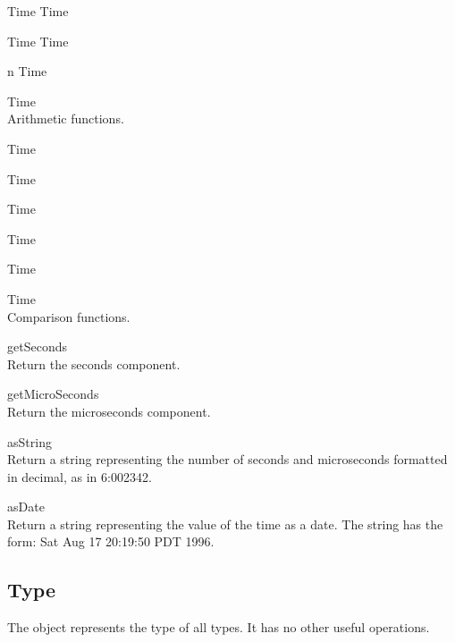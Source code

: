 \begin{desc}
  \item[\kw{function} \opd{$+$} \/\LB{}Time\/\RB{} \returns{} \/\LB{}Time\/\RB{}]
  \item[\kw{function} \opd{$-$} \/\LB{}Time\/\RB{} \returns{} \/\LB{}Time\/\RB{}]
  \item[\kw{function} \opd{$*$} \/\LB{}n \CO{} \tn{Integer}\/\RB{} \returns{} \/\LB{}Time\/\RB{}]
  \item[\kw{function} \opd{$/$} \/\LB{}\tn{Integer}\/\RB{} \returns{} \/\LB{}Time\/\RB{}]~\\
    Arithmetic functions.
  \item[\kw{function} \opd{$>$} \/\LB{}Time\/\RB{} \returns{} \/\LB{}\tn{Boolean}\/\RB{}]
  \item[\kw{function} \opd{$>=$} \/\LB{}Time\/\RB{} \returns{} \/\LB{}\tn{Boolean}\/\RB{}]
  \item[\kw{function} \opd{$<$} \/\LB{}Time\/\RB{} \returns{} \/\LB{}\tn{Boolean}\/\RB{}]
  \item[\kw{function} \opd{$<=$} \/\LB{}Time\/\RB{} \returns{} \/\LB{}\tn{Boolean}\/\RB{}]
  \item[\kw{function} \opd{$=$} \/\LB{}Time\/\RB{} \returns{} \/\LB{}\tn{Boolean}\/\RB{}]
  \item[\kw{function} \opd{$!=$} \/\LB{}Time\/\RB{} \returns{} \/\LB{}\tn{Boolean}\/\RB{}]~\\
    Comparison functions.
  \item[\kw{function} getSeconds \returns{} \/\LB{}\tn{Integer}\/\RB{}]~\\
    Return the seconds component.
  \item[\kw{function} getMicroSeconds \returns{} \/\LB{}\tn{Integer}\/\RB{}]~\\
    Return the microseconds component.
  \item[\kw{function} asString \returns{} \/\LB{}\tn{String}\/\RB{}]~\\
    Return a string representing the number of seconds and microseconds
    formatted in decimal, as in 6:002342.
  \item[\kw{function} asDate \returns{} \/\LB{}\tn{String}\/\RB{}]~\\
    Return a string representing the value of the time as a date.  The
    string has the form: Sat Aug 17 20:19:50 PDT 1996.
\end{desc}

\subsection{Type}
\label{builtin Type}
The object  represents the type of all types.  It has no other
useful operations.

